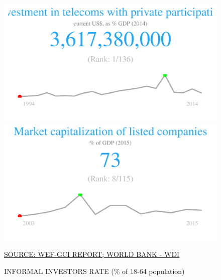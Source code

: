 \documentclass{article}\usepackage[]{graphicx}\usepackage[]{color}
\makeatletter
\def\maxwidth{ %
  \ifdim\Gin@nat@width>\linewidth
    \linewidth
  \else
    \Gin@nat@width
  \fi
}
\makeatother
\begin{document}
\begin{figure}
\begin{minipage}[c]{0.95\textwidth}
\begin{minipage}[c]{0.95\textwidth}
\begin{minipage}[c]{0.32\textwidth}
{\centering \includegraphics[width=\maxwidth]{figure/figure_sparkline_Fin2-1} 

}



      \end{minipage}
      \begin{minipage}[c]{0.32\textwidth}


{\centering \includegraphics[width=\maxwidth]{figure/figure_sparkline_Fin3-1} 

}



      \end{minipage}
       \hspace{4ex}\scriptsize{\href{NA}{\textcolor[HTML]{22A6F5}{SOURCE: WEF-GCI REPORT; WORLD BANK - WDI}}}
  \end{minipage}
    
  \begin{minipage}[c]{0.95\textwidth} %
    \vspace*{0.6cm}
    \begin{minipage}[c]{0.49\textwidth} %
      \small{\textcolor[HTML]{818181}{INFORMAL INVESTORS RATE (\% of 18-64 population)}}



\end{minipage}
\end{minipage}
\end{minipage}
\end{figure}
\end{document}
